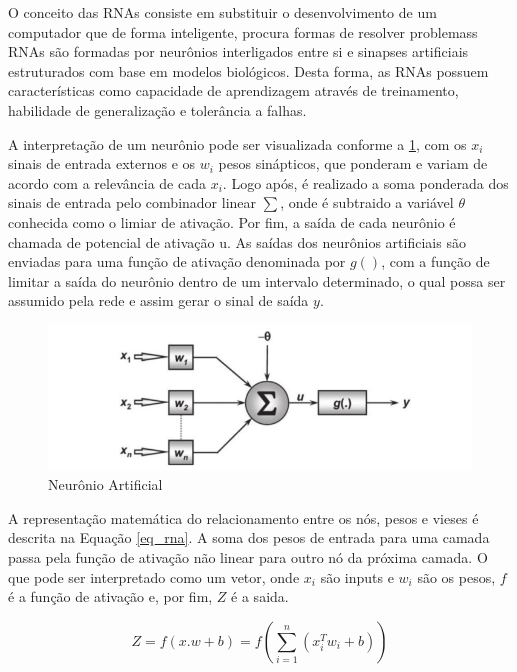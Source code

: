 O conceito das RNAs consiste em substituir o desenvolvimento de um computador que de forma inteligente, procura formas de resolver problemass RNAs são formadas por neurônios interligados entre si e sinapses artificiais estruturados com base em modelos biológicos. Desta forma, as RNAs possuem características como capacidade de aprendizagem através de treinamento, habilidade de generalização e tolerância a falhas.\cite{rna2}

A interpretação de um neurônio pode ser visualizada conforme a \ref{fig_rna}, com os {$x_i$} sinais de entrada externos e os {$w_i$} pesos sinápticos, que ponderam e variam de acordo com a relevância de cada {$x_i$}. Logo após, é realizado a soma ponderada dos sinais de entrada pelo combinador linear {$\sum$}, onde é subtraido a variável {$\theta$} conhecida como o limiar de ativação. Por fim, a saída de cada neurônio é chamada de potencial de ativação u. As saídas dos neurônios artificiais são enviadas para uma função de ativação denominada por {$g()$}, com a função de limitar a saída do neurônio dentro de um intervalo determinado, o qual possa ser assumido pela rede e assim gerar o sinal de saída {$y$}.\cite{acoes}

\begin{figure}[!h]
	\centering
	\label{fig_rna}
		\includegraphics[keepaspectratio=true,scale=0.5]{figuras/neuronio_artificial.png}
	\caption{Neurônio Artificial \cite{silva}}
\end{figure}

A representação matemática do relacionamento entre os nós, pesos e vieses é descrita na Equação \ref{eq_rna}. A soma dos pesos de entrada para uma camada passa pela função de ativação não linear para outro nó da próxima camada. O que pode ser interpretado como um vetor, onde {$x_i$} são inputs e {$w_i$} são os pesos, {$f$} é a função de ativação e, por fim, {$Z$} é a saida.

\begin{equation}
\label{eq_rna}
	Z = f(x.w+b) = f(\sum_{i=1}^n (x_i^T w_i + b))
\end{equation}

